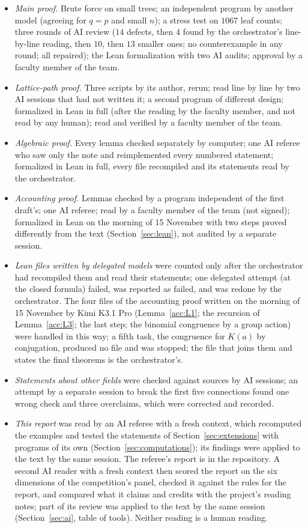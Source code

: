 \documentclass[11pt]{article}
\theoremstyle{definition}
\theoremstyle{remark}
\numberwithin{equation}{section}
\numberwithin{figure}{section}
\begin{document}
\begin{itemize}[itemsep=1pt]
\item \emph{Main proof.} Brute force on small trees; an independent program by another model (agreeing for
 $q=p$ and small $n$); a stress test on $1067$ leaf counts; three rounds of AI review ($14$ defects, then $4$
 found by the orchestrator's line-by-line reading, then $10$, then $13$ smaller ones; no counterexample in
 any round; all repaired); the Lean formalization with two AI audits; approval by a faculty member of the
 team.
\item \emph{Lattice-path proof.} Three scripts by its author, rerun; read line by line by two AI sessions
 that had not written it; a second program of different design; formalized in Lean in full (after the
 reading by the faculty member, and not read by any human); read and verified by a faculty member of the team.
\item \emph{Algebraic proof.} Every lemma checked separately by computer; one AI referee who saw only the
 note and reimplemented every numbered statement; formalized in Lean in full, every file recompiled and its
 statements read by the orchestrator.
\item \emph{Accounting proof.} Lemmas checked by a program independent of the first draft's; one AI referee;
 read by a faculty member of the team (not signed); formalized in Lean on the morning of 15 November with two
 steps proved differently from the text (Section~\ref{sec:lean}), not audited by a separate session.
\item \emph{Lean files written by delegated models} were counted only after the orchestrator had recompiled
 them and read their statements; one delegated attempt (at the closed formula) failed, was reported as
 failed, and was redone by the orchestrator. The four files of the accounting proof written on the morning
 of 15 November by Kimi K3.1 Pro (Lemma~\ref{acc:L1}; the recursion of Lemma~\ref{acc:L3}; the last step; the
 binomial congruence by a group action) were handled in this way; a fifth task, the congruence for $K(a)$ by
 conjugation, produced no file and was stopped; the file that joins them and states the final theorems is the orchestrator's.
\item \emph{Statements about other fields} were checked against sources by AI sessions; an attempt by a
 separate session to break the first five connections found one wrong check and three overclaims, which were
 corrected and recorded.
\item \emph{This report} was read by an AI referee with a fresh context, which recomputed the examples and
 tested the statements of Section~\ref{sec:extensions} with programs of its own
 (Section~\ref{sec:computations}); its findings were applied to the text by the same session. The referee's
 report is in the repository. A second AI reader with a fresh context then scored the report on the six
 dimensions of the competition's panel, checked it against the rules for the report, and compared what it
 claims and credits with the project's reading notes; part of its review was applied to the text by the same
 session (Section~\ref{sec:ai}, table of tools). Neither reading is a human reading.
\end{itemize}
\end{document}
